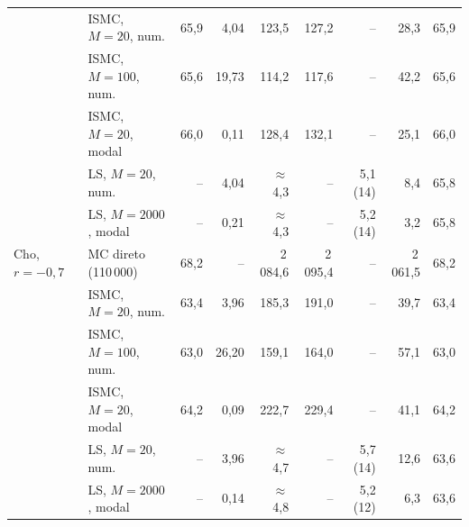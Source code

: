 \begin{landscape}
\begin{table}[H]
\begin{tabular}{llrrrrrrr}
 & ISMC, $M = 20$, num. & 65,9 & 4,04 & 123,5 & 127,2 & -- & 28,3 & 65,9 \\
 & ISMC, $M = 100$, num. & 65,6 & 19,73 & 114,2 & 117,6 & -- & 42,2 & 65,6 \\
 & ISMC, $M = 20$, modal & 66,0 & 0,11 & 128,4 & 132,1 & -- & 25,1 & 66,0 \\
 & LS, $M = 20$, num. & -- & 4,04 & $\approx$4,3 & -- & 5,1 (14) & 8,4 & 65,8 \\
 & LS, $M = 2000$, modal & -- & 0,21 & $\approx$4,3 & -- & 5,2 (14) & 3,2 & 65,8 \\
\midrule
Cho, $r = -0{,}7$ & MC direto (110\,000) & 68,2 & -- & 2\,084,6 & 2\,095,4 & -- & 2\,061,5 & 68,2 \\
 & ISMC, $M = 20$, num. & 63,4 & 3,96 & 185,3 & 191,0 & -- & 39,7 & 63,4 \\
 & ISMC, $M = 100$, num. & 63,0 & 26,20 & 159,1 & 164,0 & -- & 57,1 & 63,0 \\
 & ISMC, $M = 20$, modal & 64,2 & 0,09 & 222,7 & 229,4 & -- & 41,1 & 64,2 \\
 & LS, $M = 20$, num. & -- & 3,96 & $\approx$4,7 & -- & 5,7 (14) & 12,6 & 63,6 \\
 & LS, $M = 2000$, modal & -- & 0,14 & $\approx$4,8 & -- & 5,2 (12) & 6,3 & 63,6 \\
\bottomrule\end{tabular}\end{table}
\end{landscape}
